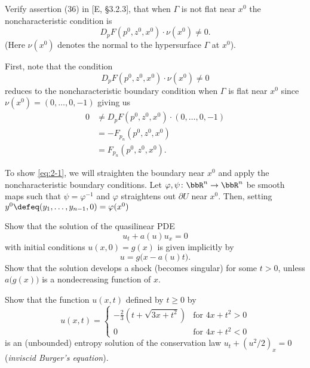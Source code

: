 \begin{problem}
  Verify assertion (36) in [E, \S 3.2.3], that when \(\Gamma\) is not flat
  near \(x^0\) the noncharacteristic condition is
  \[
    D_pF(p^0,z^0,x^0)\cdot \nu(x^0)\neq 0.
  \]
  (Here \(\nu(x^0)\) denotes the normal to the hypersurface \(\Gamma\) at
  \(x^0\)).
\end{problem}
\begin{solution}
  First, note that the condition
  \begin{equation}
    \label{eq:2-1}
    D_pF(p^0,z^0,x^0)\cdot \nu(x^0)\neq 0
  \end{equation}
  reduces to the noncharacteristic boundary condition when \(\Gamma\) is
  flat near \(x^0\) since \(\nu(x^0)=(0,\dotsc,0,-1)\) giving us
  \begin{align*}
    0&\neq D_pF(p^0,z^0,x^0)\cdot (0,\dotsc,0,-1)\\
     &=-F_{p_n}(p^0,z^0,x^0)\\
     &=F_{p_n}(p^0,z^0,x^0).
  \end{align*}

  To show \eqref{eq:2-1}, we will straighten the boundary near \(x^0\) and
  apply the noncharacteristic boundary conditions. Let
  \(\varphi,\psi\colon\bbR^n\to\bbR^n\) be smooth maps such that
  \(\psi=\varphi^{-1}\) and \(\varphi\) straightens out \(\partial U\) near
  \(x^0\). Then, setting \(y^0\defeq (y_1,\dotsc,y_{n-1},0)=\varphi(x^0)\)
\end{solution}
\newpage

\begin{problem}
  Show that the solution of the quasilinear PDE
  \[
    u_t+a(u)u_x=0
  \]
  with initial conditions \(u(x,0)=g(x)\) is given implicitly by
  \[
    u=g\bigl(x-a(u)t\bigr).
  \]
  Show that the solution develops a shock (becomes singular) for some
  \(t>0\), unless \(a\bigl(g(x)\bigr)\) is a nondecreasing function of
  \(x\).
\end{problem}
\begin{solution}

\end{solution}
\newpage

\begin{problem}
  Show that the function \(u(x,t)\) defined by \(t\geq 0\) by
  \[
    u(x,t)=
    \begin{cases}
      \displaystyle-\frac{2}{3}\left(t+\sqrt{3x+t^2}\right)
      &\text{for \(4x+t^2>0\)}\\
      0
      &\text{for \(4x+t^2<0\)}
    \end{cases}
  \]
  is an (unbounded) entropy solution of the conservation law
  \(u_t+(u^2/2)_x=0\) (\emph{inviscid Burger's equation}).
\end{problem}
\begin{solution}
\end{solution}

